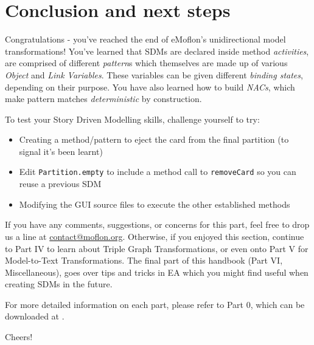 \genHeader
\section{Conclusion and next steps}

\vspace{0.5cm}

Congratulations - you've reached the end of eMoflon's unidirectional model transformations! You've learned that SDMs are declared inside method
\emph{activities}, are comprised of different \emph{pattern}s which themselves are made up of various \emph{Object} and \emph{Link Variables}. These
variables can be given different \emph{binding states}, depending on their purpose. You have also learned how to build \emph{NACs}, which make pattern
matches \emph{deterministic} by construction.

\vspace{0.5cm}

To test your Story Driven Modelling skills, challenge yourself to try:
\begin{itemize}
\item Creating a method/pattern to eject the card from the final partition (to signal it's been learnt)
\item Edit \texttt{Partition.empty} to include a method call to \texttt{removeCard} so you can reuse a previous SDM
\item Modifying the GUI source files to execute the other established methods
\end{itemize}

\vspace{0.5cm}
	
If you have any comments, suggestions, or concerns for this part, feel free to drop us a line at \href{mailto:contact@moflon.org}{contact@moflon.org}.
Otherwise, if you enjoyed this section, continue to Part IV to learn about Triple Graph Transformations, or even onto Part V for Model-to-Text Transformations.
The final part of this handbook (Part VI, Miscellaneous), goes over tips and tricks in EA which you might find useful when creating SDMs in the future. 

For more detailed information on each part, please refer to Part 0, which can be downloaded at \dlPartOne.
\vspace{0.5cm}

Cheers!
